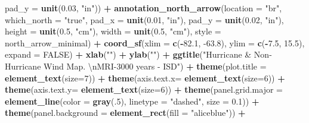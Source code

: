 \documentclass[12pt,twoside]{reedthesis}
\newenvironment{Shaded}{\begin{snugshade}}{\end{snugshade}}
\newcommand{\CharTok}[1]{\textcolor[rgb]{0.31,0.60,0.02}{#1}}
\newcommand{\DataTypeTok}[1]{\textcolor[rgb]{0.13,0.29,0.53}{#1}}
\newcommand{\DecValTok}[1]{\textcolor[rgb]{0.00,0.00,0.81}{#1}}
\newcommand{\FloatTok}[1]{\textcolor[rgb]{0.00,0.00,0.81}{#1}}
\newcommand{\KeywordTok}[1]{\textcolor[rgb]{0.13,0.29,0.53}{\textbf{#1}}}
\newcommand{\NormalTok}[1]{#1}
\newcommand{\OperatorTok}[1]{\textcolor[rgb]{0.81,0.36,0.00}{\textbf{#1}}}
\newcommand{\OtherTok}[1]{\textcolor[rgb]{0.56,0.35,0.01}{#1}}
\newcommand{\StringTok}[1]{\textcolor[rgb]{0.31,0.60,0.02}{#1}}
\begin{document}
\begin{Shaded}
\begin{Highlighting}[]
   \DataTypeTok{pad_y =} \KeywordTok{unit}\NormalTok{(}\FloatTok{0.03}\NormalTok{, }\StringTok{"in"}\NormalTok{)) }\OperatorTok{+}\StringTok{ }
\StringTok{  }\KeywordTok{annotation_north_arrow}\NormalTok{(}\DataTypeTok{location =} \StringTok{"br"}\NormalTok{, }\DataTypeTok{which_north =} \StringTok{"true"}\NormalTok{, }\DataTypeTok{pad_x =} \KeywordTok{unit}\NormalTok{(}\FloatTok{0.01}\NormalTok{, }\StringTok{"in"}\NormalTok{), }\DataTypeTok{pad_y =} \KeywordTok{unit}\NormalTok{(}\FloatTok{0.02}\NormalTok{, }\StringTok{"in"}\NormalTok{), }\DataTypeTok{height =} \KeywordTok{unit}\NormalTok{(}\FloatTok{0.5}\NormalTok{, }\StringTok{"cm"}\NormalTok{), }
   \DataTypeTok{width =} \KeywordTok{unit}\NormalTok{(}\FloatTok{0.5}\NormalTok{, }\StringTok{"cm"}\NormalTok{), }\DataTypeTok{style =}\NormalTok{ north_arrow_minimal) }\OperatorTok{+}
\StringTok{  }\KeywordTok{coord_sf}\NormalTok{(}\DataTypeTok{xlim =} \KeywordTok{c}\NormalTok{(}\OperatorTok{-}\FloatTok{82.1}\NormalTok{, }\FloatTok{-63.8}\NormalTok{), }\DataTypeTok{ylim =} \KeywordTok{c}\NormalTok{(}\OperatorTok{-}\FloatTok{7.5}\NormalTok{, }\FloatTok{15.5}\NormalTok{), }\DataTypeTok{expand =} \OtherTok{FALSE}\NormalTok{) }\OperatorTok{+}
\StringTok{  }\KeywordTok{xlab}\NormalTok{(}\StringTok{""}\NormalTok{) }\OperatorTok{+}\StringTok{ }
\StringTok{  }\KeywordTok{ylab}\NormalTok{(}\StringTok{""}\NormalTok{) }\OperatorTok{+}\StringTok{ }
\StringTok{  }\KeywordTok{ggtitle}\NormalTok{(}\StringTok{"Hurricane & Non-Hurricane Wind Map. }\CharTok{\textbackslash{}n}\StringTok{MRI-3000 years - ISD"}\NormalTok{) }\OperatorTok{+}\StringTok{ }
\StringTok{  }\KeywordTok{theme}\NormalTok{(}\DataTypeTok{plot.title =} \KeywordTok{element_text}\NormalTok{(}\DataTypeTok{size=}\DecValTok{7}\NormalTok{)) }\OperatorTok{+}
\StringTok{  }\KeywordTok{theme}\NormalTok{(}\DataTypeTok{axis.text.x=} \KeywordTok{element_text}\NormalTok{(}\DataTypeTok{size=}\DecValTok{6}\NormalTok{)) }\OperatorTok{+}\StringTok{ }
\StringTok{  }\KeywordTok{theme}\NormalTok{(}\DataTypeTok{axis.text.y=} \KeywordTok{element_text}\NormalTok{(}\DataTypeTok{size=}\DecValTok{6}\NormalTok{)) }\OperatorTok{+}
\StringTok{  }\KeywordTok{theme}\NormalTok{(}\DataTypeTok{panel.grid.major =} \KeywordTok{element_line}\NormalTok{(}\DataTypeTok{color =} \KeywordTok{gray}\NormalTok{(.}\DecValTok{5}\NormalTok{), }\DataTypeTok{linetype =} \StringTok{"dashed"}\NormalTok{, }\DataTypeTok{size =} \FloatTok{0.1}\NormalTok{)) }\OperatorTok{+}
\StringTok{  }\KeywordTok{theme}\NormalTok{(}\DataTypeTok{panel.background =} \KeywordTok{element_rect}\NormalTok{(}\DataTypeTok{fill =} \StringTok{"aliceblue"}\NormalTok{)) }\OperatorTok{+}

\end{Highlighting}
\end{Shaded}
\end{document}
